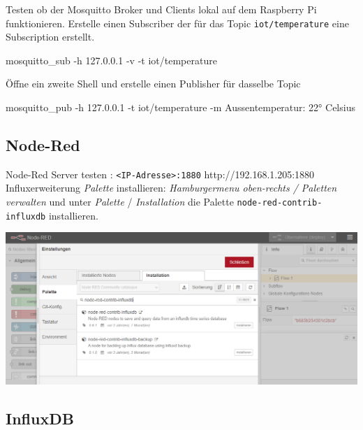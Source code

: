 \documentclass[
  11pt,
  a4paperpaper,
  oneside, openany  ,captions=tableheading
]{scrbook}
\newenvironment{Shaded}{\begin{snugshade}}{\end{snugshade}}
\newcommand{\AttributeTok}[1]{\textcolor[rgb]{0.40,0.45,0.13}{#1}}
\newcommand{\ExtensionTok}[1]{\textcolor[rgb]{0.00,0.23,0.31}{#1}}
\newcommand{\NormalTok}[1]{\textcolor[rgb]{0.00,0.23,0.31}{#1}}
\newcommand{\StringTok}[1]{\textcolor[rgb]{0.13,0.47,0.30}{#1}}
\theoremstyle{definition}
\theoremstyle{remark}
\begin{document}
Testen ob der Mosquitto Broker und Clients lokal auf dem Raspberry Pi
funktionieren. Erstelle einen Subscriber der für das Topic
\texttt{iot/temperature} eine Subscription erstellt.

\begin{Shaded}
\begin{Highlighting}[]
\ExtensionTok{mosquitto\_sub} \AttributeTok{{-}h}\NormalTok{ 127.0.0.1 }\AttributeTok{{-}v} \AttributeTok{{-}t} \StringTok{\textquotesingle{}iot/temperature\textquotesingle{}}
\end{Highlighting}
\end{Shaded}

Öffne ein zweite Shell und erstelle einen Publisher für dasselbe Topic

\begin{Shaded}
\begin{Highlighting}[]
\ExtensionTok{mosquitto\_pub} \AttributeTok{{-}h}\NormalTok{ 127.0.0.1 }\AttributeTok{{-}t} \StringTok{\textquotesingle{}iot/temperature\textquotesingle{}} \AttributeTok{{-}m} \StringTok{\textquotesingle{}Aussentemperatur: 22° Celsius\textquotesingle{}}
\end{Highlighting}
\end{Shaded}

\subsection{Node-Red}\label{node-red}

Node-Red Server testen :
\texttt{\textless{}IP-Adresse\textgreater{}:1880}
http://192.168.1.205:1880 Influxerweiterung \emph{Palette} installieren:
\emph{Hamburgermenu oben-rechts / Paletten verwalten} und unter
\emph{Palette} / \emph{Installation} die Palette
\texttt{node-red-contrib-influxdb} installieren.

\includegraphics{images/5200_iot_nodered_influxdb_erweiterung.png}

\subsection{InfluxDB}\label{influxdb}
\end{document}
